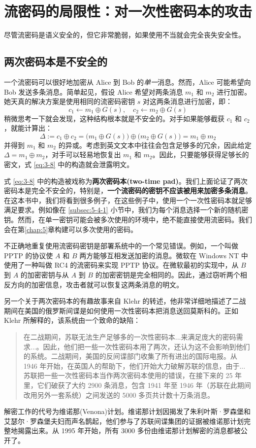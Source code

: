 \section{流密码的局限性：对一次性密码本的攻击}

尽管流密码是语义安全的，但它非常脆弱，如果使用不当就会完全丧失安全性。

\subsection{两次密码本是不安全的}

一个流密码可以很好地加密从 Alice 到 Bob 的\emph{单一}消息。然而，Alice 可能希望向 Bob 发送多条消息。简单起见，假设 Alice 希望对两条消息 $m_1$ 和 $m_2$ 进行加密。她天真的解决方案是使用相同的流密码密钥 $s$ 对这两条消息进行加密，即：
\begin{equation}\label{eq:3-8}
c_1\leftarrow m_1\oplus G(s),\quad
c_2\leftarrow m_2\oplus G(s)
\end{equation}
稍微思考一下就会发现，这种结构根本就是不安全的。对手如果能够截获 $c_1$ 和 $c_2$，就能计算出：
\[
\Delta:=c_1\oplus c_2=
\big(m_1\oplus G(s)\big)\oplus\big(m_2\oplus G(s)\big)
=m_1\oplus m_2
\]
并得到 $m_1$ 和 $m_2$ 的异或。考虑到英文文本中往往会包含足够多的冗余，因此给定 $\Delta=m_1\oplus m_2$，对手可以轻易地恢复出 $m_1$ 和 $m_2$。因此，只要能够获得足够长的密文，式 \ref{eq:3-8} 中的构造就会泄露明文。

式 \ref{eq:3-8} 中的构造被戏称为\textbf{两次密码本(two-time pad)}。我们上面论证了两次密码本是完全不安全的，特别是，\textbf{一个流密码的密钥不应该被用来加密多条消息}。在这本书中，我们将看到很多例子，在这些例子中，使用一个一次性密码本就足够满足要求。例如像在 \ref{subsec:5-4-1} 小节中，我们为每个消息选择一个新的随机密钥。然而，在单一密钥可能会被多次使用的环境中，绝不能直接使用流密码。我们会在第\ref{chap:5}章构建可以多次使用的密码。

不正确地重复使用流密码密钥是部署系统中的一个常见错误。例如，一个叫做 PPTP 的协议使 $A$ 和 $B$ 两方能够互相发送加密的消息。微软在 Windows NT 中使用了一种叫做 RC4 的流密码来实现 PPTP 协议。在微软最初的实现中，从 $B$ 到 $A$ 的加密密钥与从 $A$ 到 $B$ 的加密密钥是完全相同的。因此，通过窃听两个相反方向的加密信息，攻击者就可以恢复这两条消息的明文。

另一个关于两次密码本的有趣故事来自 Klehr 的转述，他非常详细地描述了二战期间在美国的俄罗斯间谍是如何使用一次性密码本把消息送回莫斯科的。正如 Klehr 所解释的，该系统由一个致命的缺陷：
\begin{quote}
在二战期间，苏联无法生产足够多的一次性密码本...来满足庞大的密码需求...。因此，他们把一些一次性密码本用了两次，还认为这不会影响到他们的系统。二战期间，美国的反间谍部门收集了所有进出的国际电报。从 1946 年开始，在英国人的帮助下，他们开始大力破解苏联的信息，由于...苏联把一些一次性密码本当作两次密码本使用的错误，在接下来的 25 年里，它们破获了大约 2900 条消息，包含 1941 年至 1946 年（苏联在此期间改用另外一套系统）之间发送的 5000 多页共计数十万条消息。
\end{quote}
解密工作的代号为维诺那(Venona)计划。维诺那计划因揭发了朱利叶斯·罗森堡和艾瑟尔·罗森堡夫妇而声名鹊起，他们参与了苏联间谍集团的证据被维诺那计划完整地揭露出来。从 1995 年开始，所有 3000 多份由维诺那计划解密的消息都被公开了。

